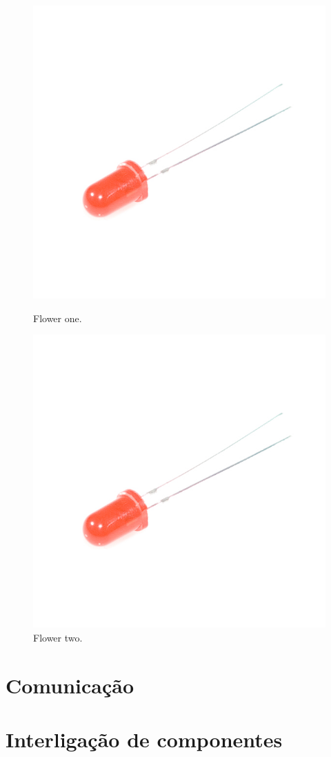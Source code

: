 \begin{figure}[!tbp]
	\centering
	\begin{minipage}[b]{0.4\textwidth}
		\includegraphics[width=\textwidth]{img/hardware/led.jpg}
		\caption{Flower one.}
	\end{minipage}
	\hfill
	\begin{minipage}[b]{0.4\textwidth}
		\includegraphics[width=\textwidth]{img/hardware/led.jpg}
		\caption{Flower two.}
	\end{minipage}
\end{figure}


\section{Comunicação}



\section{Interligação de componentes}


